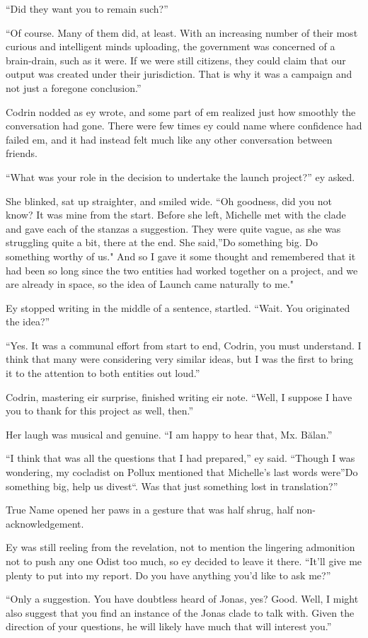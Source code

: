 ``Did they want you to remain such?''

``Of course. Many of them did, at least. With an increasing number of their most curious and intelligent minds uploading, the government was concerned of a brain-drain, such as it were. If we were still citizens, they could claim that our output was created under their jurisdiction. That is why it was a campaign and not just a foregone conclusion.''

Codrin nodded as ey wrote, and some part of em realized just how smoothly the conversation had gone. There were few times ey could name where confidence had failed em, and it had instead felt much like any other conversation between friends.

``What was your role in the decision to undertake the launch project?'' ey asked.

She blinked, sat up straighter, and smiled wide. ``Oh goodness, did you not know? It was mine from the start. Before she left, Michelle met with the clade and gave each of the stanzas a suggestion. They were quite vague, as she was struggling quite a bit, there at the end. She said,''Do something big. Do something worthy of us." And so I gave it some thought and remembered that it had been so long since the two entities had worked together on a project, and we are already in space, so the idea of Launch came naturally to me."

Ey stopped writing in the middle of a sentence, startled. ``Wait. You originated the idea?''

``Yes. It was a communal effort from start to end, Codrin, you must understand. I think that many were considering very similar ideas, but I was the first to bring it to the attention to both entities out loud.''

Codrin, mastering eir surprise, finished writing eir note. ``Well, I suppose I have you to thank for this project as well, then.''

Her laugh was musical and genuine. ``I am happy to hear that, Mx. Bălan.''

``I think that was all the questions that I had prepared,'' ey said. ``Though I was wondering, my cocladist on Pollux mentioned that Michelle's last words were''Do something big, help us divest``. Was that just something lost in translation?''

True Name opened her paws in a gesture that was half shrug, half non-acknowledgement.

Ey was still reeling from the revelation, not to mention the lingering admonition not to push any one Odist too much, so ey decided to leave it there. ``It'll give me plenty to put into my report. Do you have anything you'd like to ask me?''

``Only a suggestion. You have doubtless heard of Jonas, yes? Good. Well, I might also suggest that you find an instance of the Jonas clade to talk with. Given the direction of your questions, he will likely have much that will interest you.''
